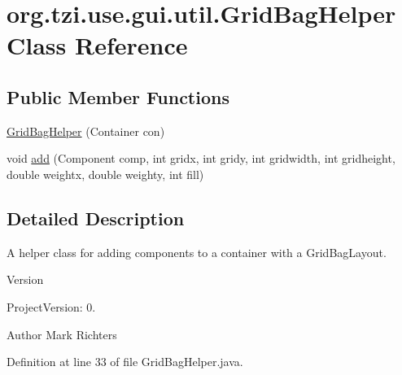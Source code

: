 \hypertarget{classorg_1_1tzi_1_1use_1_1gui_1_1util_1_1_grid_bag_helper}{\section{org.\-tzi.\-use.\-gui.\-util.\-Grid\-Bag\-Helper Class Reference}
\label{classorg_1_1tzi_1_1use_1_1gui_1_1util_1_1_grid_bag_helper}
}
\subsection*{Public Member Functions}
\begin{DoxyCompactItemize}
\item 
\hyperlink{classorg_1_1tzi_1_1use_1_1gui_1_1util_1_1_grid_bag_helper_a600c0d3f39a3a0df5ebb89fecba5b983}{Grid\-Bag\-Helper} (Container con)
\item 
void \hyperlink{classorg_1_1tzi_1_1use_1_1gui_1_1util_1_1_grid_bag_helper_a02d47714c641d017519e10b6963cbf41}{add} (Component comp, int gridx, int gridy, int gridwidth, int gridheight, double weightx, double weighty, int fill)
\end{DoxyCompactItemize}


\subsection{Detailed Description}
A helper class for adding components to a container with a Grid\-Bag\-Layout.

\begin{DoxyVersion}{Version}

\end{DoxyVersion}
\begin{DoxyParagraph}{Project\-Version\-:}
0. 
\end{DoxyParagraph}
\begin{DoxyAuthor}{Author}
Mark Richters 
\end{DoxyAuthor}


Definition at line 33 of file Grid\-Bag\-Helper.\-java.



